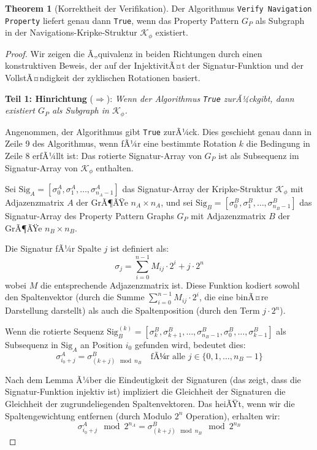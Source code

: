 ﻿\documentclass[a4paper,12pt]{article}
\theoremstyle{definition}
\newtheorem{theorem}{Theorem}[section]
\begin{document}
\begin{theorem}[Korrektheit der Verifikation]
Der Algorithmus \texttt{Verify Navigation Property} liefert genau dann \texttt{True}, wenn das Property Pattern $G_P$ als Subgraph in der Navigations-Kripke-Struktur $\mathcal{K}_{\phi}$ existiert.
\end{theorem}

\begin{proof}
Wir zeigen die Ã„quivalenz in beiden Richtungen durch einen konstruktiven Beweis, der auf der InjektivitÃ¤t der Signatur-Funktion und der VollstÃ¤ndigkeit der zyklischen Rotationen basiert.

\textbf{Teil 1: Hinrichtung} ($\Rightarrow$): \textit{Wenn der Algorithmus \texttt{True} zurÃ¼ckgibt, dann existiert $G_P$ als Subgraph in $\mathcal{K}_{\phi}$.}

Angenommen, der Algorithmus gibt \texttt{True} zurÃ¼ck. Dies geschieht genau dann in Zeile 9 des Algorithmus, wenn fÃ¼r eine bestimmte Rotation $k$ die Bedingung in Zeile 8 erfÃ¼llt ist: Das rotierte Signatur-Array von $G_P$ ist als Subsequenz im Signatur-Array von $\mathcal{K}_{\phi}$ enthalten.

Sei $\text{Sig}_A = [\sigma_0^A, \sigma_1^A, \ldots, \sigma_{n_A-1}^A]$ das Signatur-Array der Kripke-Struktur $\mathcal{K}_{\phi}$ mit Adjazenzmatrix $A$ der GrÃ¶ÃŸe $n_A \times n_A$, und sei $\text{Sig}_B = [\sigma_0^B, \sigma_1^B, \ldots, \sigma_{n_B-1}^B]$ das Signatur-Array des Property Pattern Graphs $G_P$ mit Adjazenzmatrix $B$ der GrÃ¶ÃŸe $n_B \times n_B$.

Die Signatur fÃ¼r Spalte $j$ ist definiert als:
\begin{equation}
\sigma_j = \sum_{i=0}^{n-1} M_{ij} \cdot 2^i + j \cdot 2^n
\end{equation}
wobei $M$ die entsprechende Adjazenzmatrix ist. Diese Funktion kodiert sowohl den Spaltenvektor (durch die Summe $\sum_{i=0}^{n-1} M_{ij} \cdot 2^i$, die eine binÃ¤re Darstellung darstellt) als auch die Spaltenposition (durch den Term $j \cdot 2^n$).

Wenn die rotierte Sequenz $\text{Sig}_B^{(k)} = [\sigma_k^B, \sigma_{k+1}^B, \ldots, \sigma_{n_B-1}^B, \sigma_0^B, \ldots, \sigma_{k-1}^B]$ als Subsequenz in $\text{Sig}_A$ an Position $i_0$ gefunden wird, bedeutet dies:
\begin{equation}
\sigma_{i_0+j}^A = \sigma_{(k+j) \mod n_B}^B \quad \text{fÃ¼r alle } j \in \{0, 1, \ldots, n_B-1\}
\end{equation}

Nach dem Lemma Ã¼ber die Eindeutigkeit der Signaturen (das zeigt, dass die Signatur-Funktion injektiv ist) impliziert die Gleichheit der Signaturen die Gleichheit der zugrundeliegenden Spaltenvektoren. Das heiÃŸt, wenn wir die Spaltengewichtung entfernen (durch Modulo $2^n$ Operation), erhalten wir:
\begin{equation}
\sigma_{i_0+j}^A \mod 2^{n_A} = \sigma_{(k+j) \mod n_B}^B \mod 2^{n_B}
\end{equation}


\end{proof}
\end{document}
